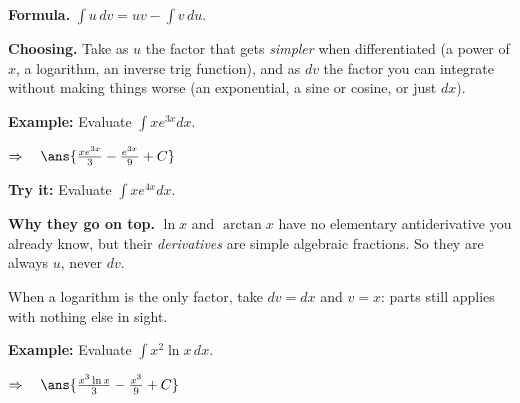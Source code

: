 \documentclass[12pt]{article}
\begin{document}


\begin{formulabox}
\textbf{Formula.} $\displaystyle\int u\,dv = uv - \int v\,du$.\par
\textbf{Choosing.} Take as $u$ the factor that gets \emph{simpler} when
differentiated (a power of $x$, a logarithm, an inverse trig function), and as
$dv$ the factor you can integrate without making things worse (an exponential,
a sine or cosine, or just $dx$).
\end{formulabox}

\begin{examplebox}
\textbf{Example:} \quad Evaluate $\displaystyle\int x e^{3x}dx$.

$\Rightarrow\quad \ans{\tfrac{xe^{3x}}{3} - \tfrac{e^{3x}}{9} + C}$
\end{examplebox}

\begin{tryitbox}
\textbf{Try it:} \quad Evaluate $\displaystyle\int x e^{4x}dx$.\\[2pt]
\end{tryitbox}


\begin{formulabox}
\textbf{Why they go on top.} $\ln x$ and $\arctan x$ have no elementary
antiderivative you already know, but their \emph{derivatives} are simple
algebraic fractions. So they are always $u$, never $dv$.\par
When a logarithm is the only factor, take $dv = dx$ and $v = x$: parts still
applies with nothing else in sight.
\end{formulabox}

\begin{examplebox}
\textbf{Example:} \quad Evaluate $\displaystyle\int x^2\ln x\,dx$.

$\Rightarrow\quad \ans{\tfrac{x^3\ln x}{3} - \tfrac{x^3}{9} + C}$
\end{examplebox}
\end{document}
